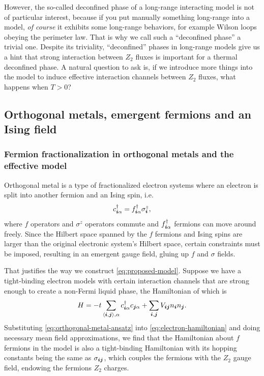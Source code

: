 \documentclass[hyperref, a4paper]{article}
\newcommand*{\pair}[1]{\langle #1 \rangle}
\newcommand*{\Ztwo}{$\mathbb{Z}_2$ }
\def\mathbb#1{#1}%
\begin{document}
However, the so-called deconfined phase of a long-range interacting model is not of particular interest, because if you put manually something long-range into a model, \emph{of course} it exhibits some long-range behaviors, for example Wilson loops obeying the perimeter law.
That is why we call such a ``deconfined phase'' a trivial one.
Despite its triviality, ``deconfined'' phases in long-range models give us a hint that strong interaction between \Ztwo fluxes is important for a thermal deconfined phase.
A natural question to ask is, if we introduce more things into the model to induce effective interaction channels between \Ztwo fluxes, what happens when $T > 0$?

\subsection{Orthogonal metals, emergent fermions and an Ising field}

\subsubsection{Fermion fractionalization in orthogonal metals and the effective model}

Orthogonal metal is a type of fractionalized electron systems where an electron is split into another fermion and an Ising spin, i.e.
\begin{equation}
    c^\dagger_{\vb*{i} \alpha} = f^\dagger_{\vb*{i} \alpha} \sigma^z_{\vb*{i}}, 
    \label{eq:orthogonal-metal-ansatz}
\end{equation}
where $f$ operators and $\sigma^z$ operators commute and $f^\dagger_{\vb*{i} \alpha}$ fermions can move around freely. 
Since the Hilbert space spanned by the $f$ fermions and Ising spins are larger than the original electronic system's Hilbert space, certain constraints must be imposed, resulting in an emergent gauge field, gluing up $f$ and $\sigma$ fields.

That justifies the way we construct \eqref{eq:proposed-model}.
Suppose we have a tight-binding electron models with certain interaction channels that are strong enough to create a non-Fermi liquid phase, the Hamiltonian of which is 
\begin{equation}
    H = - t \sum_{\pair{\vb*{i}, \vb*{j}}, \alpha} c^\dagger_{\vb*{i} \alpha} c_{\vb*{j} \alpha} + \sum_{\vb*{i}, \vb*{j}} V_{\vb*{i} \vb*{j}} n_{\vb*{i}} n_{\vb*{j}}.
    \label{eq:electron-hamiltonian}
\end{equation}
Substituting \eqref{eq:orthogonal-metal-ansatz} into \eqref{eq:electron-hamiltonian} and doing necessary mean field approximations, we find that the Hamiltonian about $f$ fermions in the model is also a tight-binding Hamiltonian with its hopping constants being the same as $\sigma_{\vb*{i} \vb*{j}}$, which couples the fermions with the \Ztwo gauge field, endowing the fermions \Ztwo charges.
\end{document}
